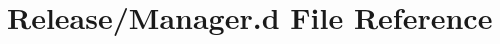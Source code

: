\hypertarget{Release_2Manager_8d}{}\section{Release/\+Manager.d File Reference}
\label{Release_2Manager_8d}
